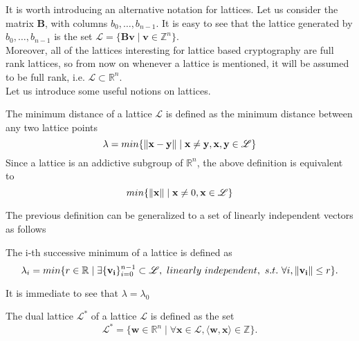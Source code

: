 It is worth introducing an alternative notation for lattices. Let us consider the matrix $\mathbf{B}$, with columns $b_0,\ldots,b_{n-1}$. It is easy to see that the lattice generated by $b_0,\ldots,b_{n-1}$ is the set $\mathscr{L}=\{\mathbf{Bv}\mid\mathbf{v}\in\mathbb{Z}^n\}$.\\
Moreover, all of the lattices interesting for lattice based cryptography are full rank lattices, so from now on whenever a lattice is mentioned, it will be assumed to be full rank, i.e. $\mathscr{L}\subset\mathbb{R}^n$.\\
Let us introduce some useful notions on lattices.

\begin{definition}
The minimum distance of a lattice $\mathscr{L}$ is defined as the minimum distance between any two lattice points
\begin{equation*}
\lambda = min\{\left\lVert \mathbf{x}-\mathbf{y} \right\rVert\mid\mathbf{x}\ne \mathbf{y}, \mathbf{x},\mathbf{y}\in\mathscr{L}\}
\end{equation*}
Since a lattice is an addictive subgroup of $\mathbb{R}^n$, the above definition is equivalent to
\begin{equation*}
min\{\left\lVert \mathbf{x} \right\rVert\mid\mathbf{x}\ne0, \mathbf{x}\in\mathscr{L}\}
\end{equation*}
\end{definition}

The previous definition can be generalized to a set of linearly independent vectors as follows
\begin{definition}
The i-th successive minimum of a lattice is defined as 
\begin{equation*}
\lambda_i = min\{r \in \mathbb{R}\mid\exists \{\mathbf{v_i}\}_{i=0}^{n-1} \subset \mathscr{L},\text{ }linearly\text{ }independent,\text{ }s.t.\text{ }\forall i,\left\lVert \mathbf{v_i} \right\rVert\leq r\}.
\end{equation*}
\end{definition}

\begin{remark}
It is immediate to see that $\lambda=\lambda_0$
\end{remark}

\begin{definition}
The dual lattice $\mathscr{L}^*$ of a lattice $\mathscr{L}$ is defined as the set
\begin{equation*}
\mathscr{L}^*=\{\mathbf{w}\in\mathbb{R}^n\mid\forall\mathbf{x}\in\mathscr{L},\langle\mathbf{w},\mathbf{x}\rangle\in\mathbb{Z}\}.
\end{equation*}
\end{definition} 

